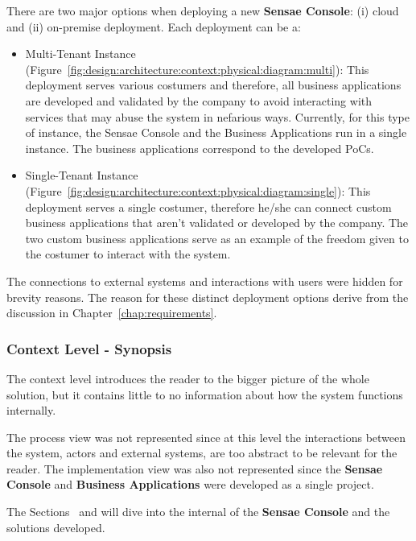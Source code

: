There are two major options when deploying a new \textbf{Sensae Console}: (i) cloud and (ii) on-premise deployment.
Each deployment can be a:

\begin{itemize}
   \item Multi-Tenant Instance (Figure~\ref{fig:design:architecture:context:physical:diagram:multi}): This deployment serves various costumers and therefore, all business applications are developed and validated by the company to avoid interacting with services that may abuse the system in nefarious ways. Currently, for this type of instance, the Sensae Console and the Business Applications run in a single instance. The business applications correspond to the developed \gls{PoC}s.
   \item Single-Tenant Instance (Figure~\ref{fig:design:architecture:context:physical:diagram:single}): This deployment serves a single costumer, therefore he/she can connect custom business applications that aren't validated or developed by the company. The two custom business applications serve as an example of the freedom given to the costumer to interact with the system. 
\end{itemize}

The connections to external systems and interactions with users were hidden for brevity reasons. The reason for these distinct deployment options derive from the discussion in Chapter~\ref{chap:requirements}.  

\subsubsection{Context Level - Synopsis}
\label{subsubsec:design:architecture:context:synopsis}

The context level introduces the reader to the bigger picture of the whole solution, but it contains little to no information about how the system functions internally.

The process view was not represented since at this level the interactions between the system, actors and external systems, are too abstract to be relevant for the reader.
The implementation view was also not represented since the \textbf{Sensae Console} and \textbf{Business Applications} were developed as a single project.

The Sections~ and  will dive into the internal of the \textbf{Sensae Console} and the solutions developed.

